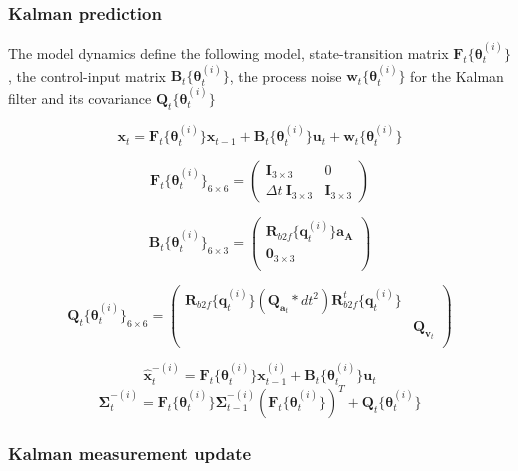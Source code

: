 \documentclass[12pt,]{article}
\begin{document}
\subsubsection{Kalman prediction}\label{kalman-prediction-1}

The model dynamics define the following model, state-transition matrix
\(\mathbf{F}_t\{\boldsymbol{\theta}^{(i)}_t\}\), the control-input
matrix \(\mathbf{B}_t\{\boldsymbol{\theta}^{(i)}_t\}\), the process
noise \(\mathbf{w}_t\{\boldsymbol{\theta}^{(i)}_t\}\) for the Kalman
filter and its covariance
\(\mathbf{Q}_t\{\boldsymbol{\theta}^{(i)}_t\}\)

\[\mathbf{x}_t = \mathbf{F}_t\{\boldsymbol{\theta}^{(i)}_t\} \mathbf{x}_{t-1} + \mathbf{B}_t\{\boldsymbol{\theta}^{(i)}_t\} \mathbf{u}_t + \mathbf{w}_t\{\boldsymbol{\theta}^{(i)}_t\}\]

\[\mathbf{F}_t\{\boldsymbol{\theta}^{(i)}_t\}_{6 \times 6} = 
\left( \begin{array}{cc}
\mathbf{I}_{3 \times 3} & 0 \\
\Delta t~\mathbf{I}_{3 \times 3} & \mathbf{I}_{3 \times 3}
\end{array} \right)\]

\[\mathbf{B}_t\{\boldsymbol{\theta}^{(i)}_t\}_{6 \times 3} = 
\left( \begin{array}{c}
\mathbf{R}_{b2f}\{\mathbf{q}^{(i)}_{t}\}\mathbf{a_A} \\
\mathbf{0}_{3 \times 3} \\
\end{array} \right)\]

\[\mathbf{Q}_t\{\boldsymbol{\theta}^{(i)}_t\}_{6 \times 6} = 
\left( \begin{array}{cc}
\mathbf{R}_{b2f}\{\mathbf{q}^{(i)}_{t}\}(\mathbf{Q}_{\mathbf{a}_t } * dt^2)\mathbf{R}^t_{b2f}\{\mathbf{q}^{(i)}_{t}\} & \\
& \mathbf{Q}_{\mathbf{v}_t }\\
\end{array} \right)\]

\[\hat{\mathbf{x}}^{-(i)}_t = \mathbf{F}_t\{\boldsymbol{\theta}^{(i)}_t\} \mathbf{x}^{(i)}_{t-1} + \mathbf{B}_t\{\boldsymbol{\theta}^{(i)}_t\} \mathbf{u}_t \]
\[ \mathbf{\Sigma}^{-(i)}_t = \mathbf{F}_t\{\boldsymbol{\theta}^{(i)}_t\} \mathbf{\Sigma}^{-(i)}_{t-1}  (\mathbf{F}_t\{\boldsymbol{\theta}^{(i)}_t\})^T + \mathbf{Q}_t\{\boldsymbol{\theta}^{(i)}_t\}\]

\subsubsection{Kalman measurement
update}\label{kalman-measurement-update}
\end{document}
